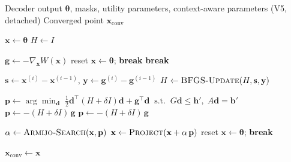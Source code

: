 \documentclass[11pt,a4paper]{article}
\newcommand{\xconv}{\mathbf{x}_{\mathrm{conv}}}
\newcommand{\thetapacked}{\boldsymbol{\theta}}
\begin{document}
\begin{algorithm}[ht]
\caption{Phase~1: SQP with BFGS and Armijo Line Search}
\label{alg:sqp}
\begin{algorithmic}[1]
\Require Decoder output $\thetapacked$, masks, utility parameters, context-aware parameters (V5, detached)
\Ensure Converged point $\xconv$

\State $\mathbf{x} \gets \thetapacked$ 
\State $H \gets I$ 

    \State $\mathbf{g} \gets -\nabla_{\mathbf{x}} W(\mathbf{x})$ 
     reset $\mathbf{x} \gets \thetapacked$; \textbf{break} \EndIf
     \textbf{break}  \EndIf

        \State $\mathbf{s} \gets \mathbf{x}^{(i)} - \mathbf{x}^{(i-1)}$, \quad $\mathbf{y} \gets \mathbf{g}^{(i)} - \mathbf{g}^{(i-1)}$
        \State $H \gets \textsc{BFGS-Update}(H, \mathbf{s}, \mathbf{y})$ 
    \EndIf

    \Statex {}
     
        \State $\mathbf{p} \gets \arg\min_{\mathbf{d}} \; \frac{1}{2}\mathbf{d}^\top(H{+}\delta I)\mathbf{d} + \mathbf{g}^\top\mathbf{d} \;\;\text{s.t.}\;\; G\mathbf{d}{\leq}\mathbf{h}',\; A\mathbf{d}{=}\mathbf{b}'$ 
         
            \State $\mathbf{p} \gets -(H + \delta I) \, \mathbf{g}$
        \EndIf
    \Else {}
        \State $\mathbf{p} \gets -(H + \delta I) \, \mathbf{g}$ 
    \EndIf

    \State $\alpha \gets \textsc{Armijo-Search}(\mathbf{x}, \mathbf{p})$ 
    \State $\mathbf{x} \gets \textsc{Project}(\mathbf{x} + \alpha\, \mathbf{p})$ 
     reset $\mathbf{x} \gets \thetapacked$; \textbf{break} \EndIf
\EndFor

\State \Return $\xconv \gets \mathbf{x}$
\end{algorithmic}
\end{algorithm}
\end{document}
